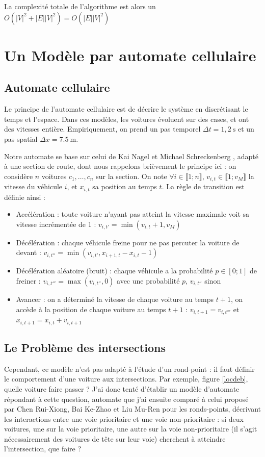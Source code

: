 \documentclass[11pt]{article}
\begin{document}
La complexité totale de l'algorithme est alors un $O(|V|^2 + |E||V|^2) = O(|E||V|^2)$

\section{Un Modèle par automate cellulaire}
	\subsection{Automate cellulaire}
	Le principe de l'automate cellulaire est de décrire le système en discrétisant le temps et l'espace. Dans ces modèles, les voitures évoluent sur des cases, et ont des vitesses entière. Empiriquement, on prend un pas temporel $\Delta t = 1,2~\mathrm{s}$ et un pas spatial $\Delta x = 7.5~\mathrm{m}$. \par
	Notre automate se base sur celui de Kai Nagel et Michael Schreckenberg \cite{NaSch}, adapté à une section de route, 
dont nous rappelons brièvement le principe ici : on considère $n$ voitures $c_1, … , c_n$ sur la section. On note $\forall i \in \llbracket 1;n \rrbracket$, $v_{i,t} \in \llbracket 1;v_M \rrbracket$ la vitesse du véhicule $i$, et $x_{i,t}$ sa position au temps $t$. La règle de transition est définie ainsi :
	\begin{itemize}
		\item Accélération : toute voiture n'ayant pas atteint la vitesse maximale voit sa vitesse incrémentée de 1 : $v_{i,t'} = \min(v_{i,t} + 1, v_M)$
		\item Décélération : chaque véhicule freine pour ne pas percuter la voiture de devant : $v_{i,t''} = \min(v_{i,t'},x_{i+1,t}-x_{i,t}-1)$
		\item Décélération aléatoire (bruit) : chaque véhicule a la probabilité $p \in [ 0;1 ]$ de freiner : $v_{i,t'''} = \max(v_{i,t''},0)$ avec une probabilité $p$, $v_{i,t''}$ sinon
		\item Avancer : on a déterminé la vitesse de chaque voiture au temps $t+1$, on accède à la position de chaque voiture au temps $t+1$ : $v_{i,t+1} = v_{i,t'''}$ et $x_{i,t+1} = x_{i,t} + v_{i,t+1}$
	\end{itemize}
	
	\subsection{Le Problème des intersections}
	Cependant, ce modèle n'est pas adapté à l'étude d'un rond-point : il faut définir le comportement d'une voiture aux intersections. Par exemple, figure \ref{locdeb}, quelle voiture faire passer ? J'ai donc tenté d'établir un modèle d'automate répondant à cette question, automate que j'ai ensuite comparé à celui proposé par Chen Rui-Xiong, Bai Ke-Zhao et Liu Mu-Ren\cite{ChPh} pour les ronds-points, décrivant les interactions entre une voie prioritaire et une voie non-prioritaire : si deux voitures, une sur la voie prioritaire, une autre sur la voie non-prioritaire (il s'agit nécessairement des voitures de tête sur leur voie) cherchent à atteindre l'intersection, que faire ?
\end{document}
